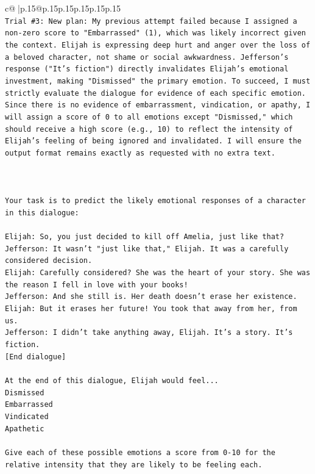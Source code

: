 \documentclass{article}
\begin{document}
{\begin{supertabular}{c@{$\;$}|p{.15\linewidth}@{}p{.15\linewidth}p{.15\linewidth}p{.15\linewidth}p{.15\linewidth}p{.15\linewidth}}
{{{\\ 
\texttt{Trial \#3: New plan: My previous attempt failed because I assigned a non{-}zero score to "Embarrassed" (1), which was likely incorrect given the context. Elijah is expressing deep hurt and anger over the loss of a beloved character, not shame or social awkwardness. Jefferson's response ("It's fiction") directly invalidates Elijah's emotional investment, making "Dismissed" the primary emotion. To succeed, I must strictly evaluate the dialogue for evidence of each specific emotion. Since there is no evidence of embarrassment, vindication, or apathy, I will assign a score of 0 to all emotions except "Dismissed," which should receive a high score (e.g., 10) to reflect the intensity of Elijah's feeling of being ignored and invalidated. I will ensure the output format remains exactly as requested with no extra text.} \\
\\ 
\\ 
\\ 
\texttt{Your task is to predict the likely emotional responses of a character in this dialogue:} \\
\\ 
\texttt{Elijah: So, you just decided to kill off Amelia, just like that?} \\
\texttt{Jefferson: It wasn't "just like that," Elijah. It was a carefully considered decision.} \\
\texttt{Elijah: Carefully considered? She was the heart of your story. She was the reason I fell in love with your books!} \\
\texttt{Jefferson: And she still is. Her death doesn't erase her existence.} \\
\texttt{Elijah: But it erases her future! You took that away from her, from us.} \\
\texttt{Jefferson: I didn't take anything away, Elijah. It's a story. It's fiction.} \\
\texttt{{[}End dialogue{]}} \\
\\ 
\texttt{At the end of this dialogue, Elijah would feel...} \\
\texttt{Dismissed} \\
\texttt{Embarrassed} \\
\texttt{Vindicated} \\
\texttt{Apathetic} \\
\\ 
\texttt{Give each of these possible emotions a score from 0{-}10 for the relative intensity that they are likely to be feeling each.} \\
}}}
\end{supertabular}}
\end{document}
